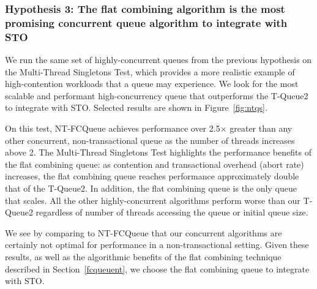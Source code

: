 \vspace{12pt}
\noindent{}

\subsubsection{Hypothesis 3: The flat combining algorithm is the most promising concurrent queue algorithm to integrate with STO}
\label{eval:hypo3}

We run the same set of highly-concurrent queues from the previous hypothesis on the Multi-Thread Singletons Test, which provides a more realistic example of high-contention workloads that a queue may experience. We look for the most scalable and performant high-concurrency queue that outperforms the T-Queue2 to integrate with STO. Selected results are shown in Figure~\ref{fig:ntqs}.

On this test, NT-FCQueue achieves performance over 2.5$\times$ greater than any other concurrent, non-transactional queue as the number of threads increases above 2. The Multi-Thread Singletons Test highlights the performance benefits of the flat combining queue: as contention and transactional overhead (abort rate) increases, the flat combining queue reaches performance approximately double that of the T-Queue2. In addition, the flat combining queue is the only queue that scales. All the other highly-concurrent algorithms perform worse than our T-Queue2 regardless of number of threads accessing the queue or initial queue size.

We see by comparing to NT-FCQueue that our concurrent algorithms are certainly not optimal for performance in a non-transactional setting.
Given these results, as well as the algorithmic benefits of the flat combining technique described in Section~\ref{fcqueuent}, we choose the flat combining queue to integrate with STO.

\vspace{12pt}
\noindent{}

